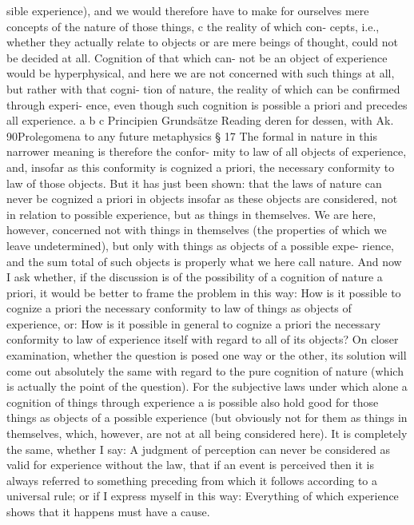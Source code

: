 sible experience), and we would therefore have to make for ourselves
mere concepts of the nature of those things, c the reality of which con-
cepts, i.e., whether they actually relate to objects or are mere beings
of thought, could not be decided at all. Cognition of that which can-
not be an object of experience would be hyperphysical, and here we
are not concerned with such things at all, but rather with that cogni-
tion of nature, the reality of which can be conﬁrmed through experi-
ence, even though such cognition is possible a priori and precedes all
experience.
a
b
c
Principien
Grundsätze
Reading deren for dessen, with Ak.
90Prolegomena to any future metaphysics
§ 17
The formal in nature in this narrower meaning is therefore the confor-
mity to law of all objects of experience, and, insofar as this conformity
is cognized a priori, the necessary conformity to law of those objects. But
it has just been shown: that the laws of nature can never be cognized a
priori in objects insofar as these objects are considered, not in relation to
possible experience, but as things in themselves. We are here, however,
concerned not with things in themselves (the properties of which we
leave undetermined), but only with things as objects of a possible expe-
rience, and the sum total of such objects is properly what we here call
nature. And now I ask whether, if the discussion is of the possibility of a
cognition of nature a priori, it would be better to frame the problem in
this way: How is it possible to cognize a priori the necessary conformity
to law of things as objects of experience, or: How is it possible in general
to cognize a priori the necessary conformity to law of experience itself with
regard to all of its objects?
On closer examination, whether the question is posed one way or the
other, its solution will come out absolutely the same with regard to the
pure cognition of nature (which is actually the point of the question).
For the subjective laws under which alone a cognition of things through
experience a is possible also hold good for those things as objects of a
possible experience (but obviously not for them as things in themselves,
which, however, are not at all being considered here). It is completely the
same, whether I say: A judgment of perception can never be considered as
valid for experience without the law, that if an event is perceived then it is
always referred to something preceding from which it follows according
to a universal rule; or if I express myself in this way: Everything of which
experience shows that it happens must have a cause.
